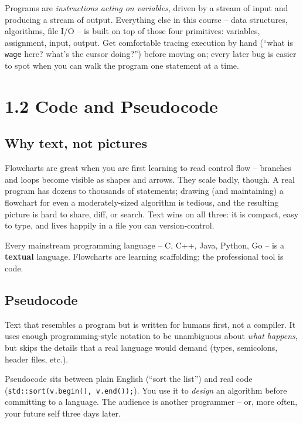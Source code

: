 \documentclass[11pt]{article}
\begin{document}
\begin{ideabox}
Programs are \emph{instructions acting on variables}, driven by a stream of
input and producing a stream of output. Everything else in this course --
data structures, algorithms, file I/O -- is built on top of those four
primitives: variables, assignment, input, output. Get comfortable tracing
execution by hand (``what is \texttt{wage} here? what's the cursor doing?'')
before moving on; every later bug is easier to spot when you can walk the
program one statement at a time.
\end{ideabox}

\section{1.2 Code and Pseudocode}

\subsection{Why text, not pictures}

Flowcharts are great when you are first learning to read control flow --
branches and loops become visible as shapes and arrows. They scale badly,
though. A real program has dozens to thousands of statements; drawing (and
maintaining) a flowchart for even a moderately-sized algorithm is tedious,
and the resulting picture is hard to share, diff, or search. Text wins on
all three: it is compact, easy to type, and lives happily in a file you can
version-control.

Every mainstream programming language -- C, C++, Java, Python, Go -- is a
\textbf{textual} language. Flowcharts are learning scaffolding; the
professional tool is code.

\subsection{Pseudocode}

\begin{defnbox}[Pseudocode]
Text that resembles a program but is written for humans first, not a
compiler. It uses enough programming-style notation to be unambiguous
about \emph{what happens}, but skips the details that a real language
would demand (types, semicolons, header files, etc.).
\end{defnbox}

Pseudocode sits between plain English (``sort the list'') and real code
(\texttt{std::sort(v.begin(), v.end());}). You use it to \emph{design}
an algorithm before committing to a language. The audience is another
programmer -- or, more often, your future self three days later.
\end{document}
